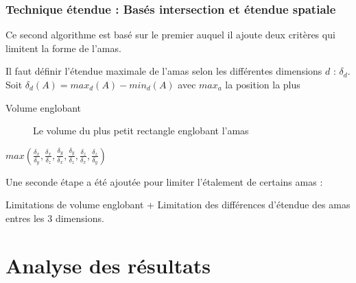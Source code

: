 \subsection{Technique étendue : Basés intersection et étendue spatiale}

Ce second algorithme est basé sur le premier auquel il ajoute deux critères qui limitent la forme de l'amas.

Il faut définir l'étendue maximale de l'amas selon les différentes dimensions $d$ : $\delta_d$. Soit $\delta_d(A) = max_d(A) - min_d(A)$ avec $max_a$ la position la plus 

\begin{description}
 \item[Volume englobant] Le volume du plus petit rectangle englobant l'amas
 \item[]
\end{description}

$max \left( \frac{\delta_x}{\delta_y}, \frac{\delta_x}{\delta_z}, \frac{\delta_y}{\delta_x}, \frac{\delta_y}{\delta_z}, \frac{\delta_z}{\delta_x}, \frac{\delta_z}{\delta_y} \right)$


Une seconde étape a été ajoutée pour limiter l'étalement de certains amas :

Limitations de volume englobant + Limitation des différences d'étendue des amas entres les 3 dimensions.


\chapter{Analyse des résultats}


